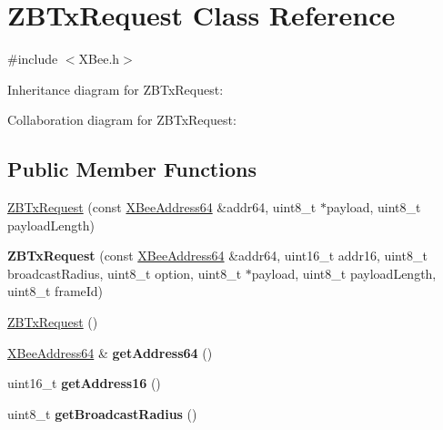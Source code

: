 \hypertarget{class_z_b_tx_request}{}\section{Z\+B\+Tx\+Request Class Reference}
\label{class_z_b_tx_request}


{\ttfamily \#include $<$X\+Bee.\+h$>$}



Inheritance diagram for Z\+B\+Tx\+Request\+:


Collaboration diagram for Z\+B\+Tx\+Request\+:
\subsection*{Public Member Functions}
\begin{DoxyCompactItemize}
\item 
\hyperlink{class_z_b_tx_request_a2e4839bb04fb5e978ae02474bcc695d6}{Z\+B\+Tx\+Request} (const \hyperlink{class_x_bee_address64}{X\+Bee\+Address64} \&addr64, uint8\+\_\+t $\ast$payload, uint8\+\_\+t payload\+Length)
\item 
\hypertarget{class_z_b_tx_request_a7f450b236b96fe14b0ad5d8aff69e1d9}{}\label{class_z_b_tx_request_a7f450b236b96fe14b0ad5d8aff69e1d9} 
{\bfseries Z\+B\+Tx\+Request} (const \hyperlink{class_x_bee_address64}{X\+Bee\+Address64} \&addr64, uint16\+\_\+t addr16, uint8\+\_\+t broadcast\+Radius, uint8\+\_\+t option, uint8\+\_\+t $\ast$payload, uint8\+\_\+t payload\+Length, uint8\+\_\+t frame\+Id)
\item 
\hyperlink{class_z_b_tx_request_a410499f31a049f0bd4bbc8299ec74e24}{Z\+B\+Tx\+Request} ()
\item 
\hypertarget{class_z_b_tx_request_adbd44bb9801c9cba0c9ea4e87ed8efa5}{}\label{class_z_b_tx_request_adbd44bb9801c9cba0c9ea4e87ed8efa5} 
\hyperlink{class_x_bee_address64}{X\+Bee\+Address64} \& {\bfseries get\+Address64} ()
\item 
\hypertarget{class_z_b_tx_request_ac75b0c6db3b6c9b54c3df2891b267950}{}\label{class_z_b_tx_request_ac75b0c6db3b6c9b54c3df2891b267950} 
uint16\+\_\+t {\bfseries get\+Address16} ()
\item 
\hypertarget{class_z_b_tx_request_a6c4a33cab93ff1d18703c8ddd4db4056}{}\label{class_z_b_tx_request_a6c4a33cab93ff1d18703c8ddd4db4056} 
uint8\+\_\+t {\bfseries get\+Broadcast\+Radius} ()
\item 
\hypertarget{class_z_b_tx_request_a4b97981c2a07afdeeacff09e479b7d45}{}\label{class_z_b_tx_request_a4b97981c2a07afdeeacff09e479b7d45} 

\end{DoxyCompactItemize}
